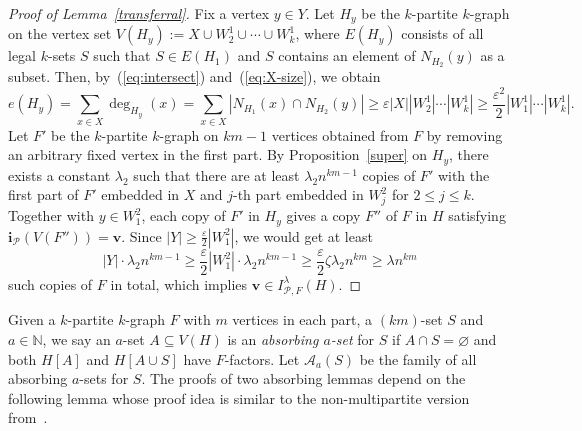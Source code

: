 \documentclass[11pt,a4paper]{article}
\theoremstyle{definition}
\begin{document}
\begin{proof}[Proof of Lemma~\ref{transferral}]
Fix a vertex $y\in Y$. Let $H_y$ be the $k$-partite $k$-graph on the vertex set $V(H_y):=X\cup W_2^1\cup\cdots \cup W_k^1$, where $E(H_y)$ consists of all legal $k$-sets $S$ such that $S\in E(H_1)$ and $S$ contains an element of $N_{H_2}(y)$ as a subset. Then, by~(\ref{eq:intersect}) and~(\ref{eq:X-size}), we obtain
\[
e(H_y)=\sum_{x\in X}\deg_{H_y}(x)=\sum_{x\in X}|N_{H_1}(x)\cap N_{H_2}(y)|\ge \varepsilon |X||W_2^1|\cdots |W_k^1|\ge \frac{\varepsilon^2}{2}|W_1^1|\cdots |W_k^1|.
\]
Let $F'$ be the $k$-partite $k$-graph on $km-1$ vertices obtained from $F$ by removing an arbitrary fixed vertex in the first part. By Proposition~\ref{super} on $H_y$, there exists a constant $\lambda_2$ such that there are at least $\lambda_2n^{km-1}$ copies of $F'$ with the first part of $F'$ embedded in $X$ and $j$-th part embedded in $W_j^2$ for $2\le j\le k$. Together with $y\in W_1^2$, each copy of $F'$ in $H_y$ gives a copy $F''$ of $F$ in $H$ satisfying $\mathbf{i}_{\mathcal{P}}(V(F''))=\mathbf{v}$. Since $|Y|\ge \frac{\varepsilon}{2}|W_1^2|$, we would get at least
\[
|Y|\cdot \lambda_2n^{km-1}\ge \frac{\varepsilon}{2}|W_1^2|\cdot \lambda_2n^{km-1}\ge \frac{\varepsilon}{2}\zeta \lambda_2n^{km}\ge \lambda n^{km}
\]
such copies of $F$ in total, which implies $\mathbf{v}\in I^{\lambda}_{\mathcal{P},F}(H)$.





    
\end{proof}


Given a $k$-partite $k$-graph $F$ with $m$ vertices in each part, a $(km)$-set $S$ and $a\in \mathbb{N}$, we say an $a$-set $A\subseteq V(H)$ is an {\emph{absorbing $a$-set}} for $S$ if $A\cap S=\varnothing$ and both $H[A]$ and $H[A\cup S]$ have $F$-factors. Let $\mathcal{A}_a(S)$ be the family of all absorbing $a$-sets for $S$.
The proofs of two absorbing lemmas depend on the following lemma whose proof idea is similar to the non-multipartite version from~\cite[Lemma 3.6]{Han2017Minimum}.
\end{document}
